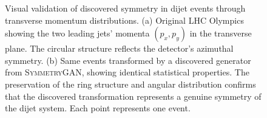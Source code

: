 \begin{figure}
\begin{subfigure}[b]{0.4\textwidth}
        \caption{}
        \label{fig:LHCOComparison_ii}
    \end{subfigure}
    \caption[Visual validation of discovered dijet symmetry through transverse momentum preservation.
]{Visual validation of discovered symmetry in dijet events through transverse momentum distributions. (a) Original LHC Olympics showing the two leading jets' momenta $(p_x, p_y)$ in the transverse plane. The circular structure reflects the detector's azimuthal symmetry. (b) Same events transformed by a discovered generator from \textsc{SymmetryGAN}, showing identical statistical properties. The preservation of the ring structure and angular distribution confirms that the discovered transformation represents a genuine symmetry of the dijet system. Each point represents one event.}
    \label{fig:LHCO_Comparison}
\end{figure}

